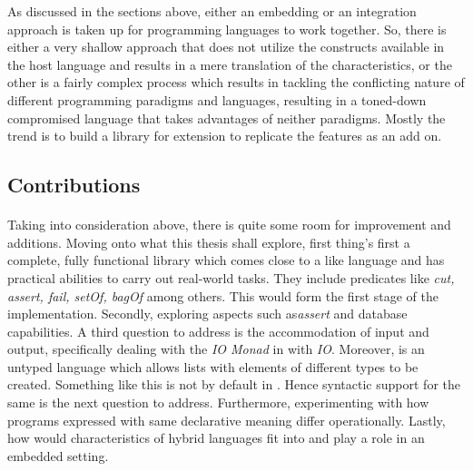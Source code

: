 \documentclass[proposal.tex]{subfiles}
\begin{document}
\par As discussed in the sections above, either an embedding or an integration approach is taken up for programming languages to work together. 
So, there is either a very shallow approach that does not utilize the constructs available in the host language and results in a mere translation of the 
characteristics, or the other is a fairly complex process which results in tackling the conflicting nature of different programming paradigms and 
languages, resulting in a toned-down  compromised language that takes advantages of neither paradigms. Mostly the trend is to build a library for 
extension to replicate the features as an add on.       

\subsection{Contributions}
\paragraph{}
Taking into consideration above, there is quite some room for improvement and additions. Moving onto what this thesis shall explore, first thing's first a 
complete, fully functional library which comes close to a  like language and has practical abilities to carry out real-world tasks. They 
include predicates like \textit{cut, assert, fail, setOf, bagOf} among others. This would form the first stage of the implementation. Secondly, exploring 
aspects such as\textit{assert} and database capabilities. A third question to address is the accommodation of input and output, specifically dealing with 
the \textit{IO Monad} in  with  \textit{IO}. Moreover,  is an untyped language which allows lists 
with elements of different types to be created. Something like this is not by default in . Hence syntactic support for the same is the next 
question to address. Furthermore, experimenting with how programs expressed with same declarative meaning differ operationally. Lastly, how would 
characteristics of hybrid languages fit into and play a role in an embedded setting.  
\end{document}
